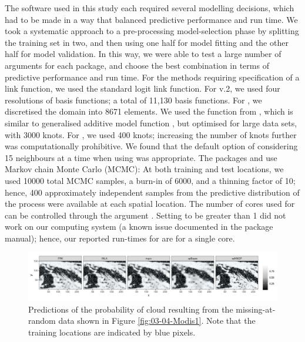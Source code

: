 \documentclass[nojss]{jss}
\newcommand{\fct}[1]{\code{#1()}}
\begin{document}
The software used in this study each required several modelling decisions, which had to be made in a way that balanced predictive performance and run time. 
 We took a systematic approach to a pre-processing model-selection phase by splitting the training set in two, and then using one half for model fitting and the other half for model validation. 
 In this way, we were able to test a large number of arguments for each package, and choose the best combination in terms of predictive performance and run time.  
 For the methods requiring specification of a link function, we used the standard logit link function.
 For  v.2, we used four resolutions of basis functions; a total of 11,130 basis functions. 
 For , we discretised the domain into 8671 elements.
 We used the \fct{bam} function from , which is similar to generalised additive model function \fct{gam}, but optimised for large data sets, with 3000 knots. 
For , we used 400 knots; increasing the number of knots further was computationally prohibitive. 
 We found that the default option of considering 15 neighbours at a time when using  was appropriate.
 The packages  and  use Markov chain Monte Carlo (MCMC): At both training and test locations, we used 10000 total MCMC samples, a burn-in of 6000, and a thinning factor of 10; hence, 400 approximately independent samples from the predictive distribution of the process were available at each spatial location. 
The number of cores used for  can be controlled through the argument . 
Setting  to be greater than 1 did not work on our computing system (a known issue documented in the  package manual); hence, our reported run-times for  are for a single core.

 
\begin{figure}
    \centering
    \includegraphics[width = \linewidth]{img/MODIS_MAR_predictions.png}
     \caption{Predictions of the probability of cloud resulting from the missing-at-random data shown in Figure \ref{fig:03-04-Modis1}. Note that the training locations are indicated by blue pixels.}   
  \label{fig:MODIS:pred_MR}
\end{figure}
\end{document}
